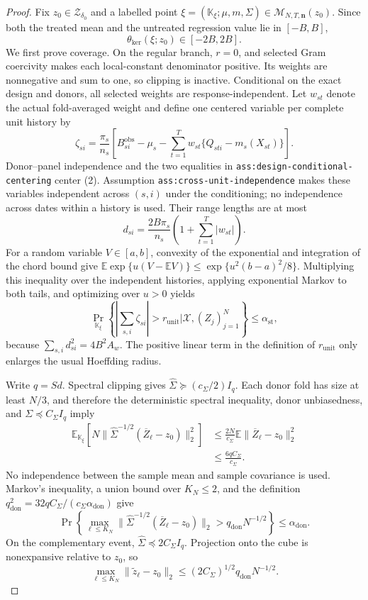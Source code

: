 \documentclass{article}
\begin{document}
\begin{proof}
Fix \(z_0\in\mathcal Z_{\delta_0}\) and a labelled point
\(\xi=(\mathbb K_\xi;\mu,m,\Sigma)\in
\mathcal M_{N,T,\mathbf n}(z_0)\).  Since both the treated mean and the untreated regression value lie in \([-B,B]\),
\[
 \theta_{\mathrm{ker}}(\xi;z_0)\in[-2B,2B].                 \tag{1}
\]
We first prove coverage.  On the regular branch, \(r=0\), and selected Gram coercivity makes each local-constant denominator positive.  Its weights are nonnegative and sum to one, so clipping is inactive.  Conditional on the exact design and donors, all selected weights are response-independent.  Let \(w_{st}\) denote the actual fold-averaged weight and define one centered variable per complete unit history by
\[
 \zeta_{si}=\frac{\pi_s}{n_s}\left[
 B_{si}^{\mathrm{obs}}-\mu_s-
 \sum_{t=1}^{T}w_{st}\{Q_{sti}-m_s(X_{st})\}\right].       \tag{2}
\]
Donor--panel independence and the two equalities in \texttt{ass:design-conditional-centering} center (2).  Assumption \texttt{ass:cross-unit-independence} makes these variables independent across \((s,i)\) under the conditioning; no independence across dates within a history is used.  Their range lengths are at most
\[
 d_{si}=\frac{2B\pi_s}{n_s}
 \left(1+\sum_{t=1}^{T}|w_{st}|\right).                    \tag{3}
\]
For a random variable \(V\in[a,b]\), convexity of the exponential and integration of the chord bound give
\(\mathbb E\exp\{u(V-\mathbb EV)\}\le
\exp\{u^2(b-a)^2/8\}\).  Multiplying this inequality over the independent histories, applying exponential Markov to both tails, and optimizing over \(u>0\) yields
\[
 \Pr_{\mathbb K_\xi}\!\left\{
 \left|\sum_{s,i}\zeta_{si}\right|>r_{\mathrm{unit}}
 \mathrel{\Big|}\mathcal X,(Z_j)_{j=1}^{N}\right\}
 \le\alpha_{\mathrm{st}},                                  \tag{4}
\]
because \(\sum_{s,i}d_{si}^2=4B^2A_w\).  The positive linear term in the definition of \(r_{\mathrm{unit}}\) only enlarges the usual Hoeffding radius.

Write \(q=Sd\).  Spectral clipping gives
\(\widehat\Sigma\succeq(c_\Sigma/2)I_q\).  Each donor fold has size at least \(N/3\), and therefore the deterministic spectral inequality, donor unbiasedness, and \(\Sigma\preceq C_\Sigma I_q\) imply
\[
\begin{aligned}
 \mathbb E_{\mathbb K_\xi}\!\left[
 N\|\widehat\Sigma^{-1/2}(\overline Z_\ell-z_0)\|_2^2
 \right]
 &\le \frac{2N}{c_\Sigma}
       \mathbb E\|\overline Z_\ell-z_0\|_2^2\\
 &\le\frac{6qC_\Sigma}{c_\Sigma}.
\end{aligned}                                               \tag{5}
\]
No independence between the sample mean and sample covariance is used.  Markov's inequality, a union bound over \(K_N\le2\), and the definition
\(q_{\mathrm{don}}^2=32qC_\Sigma/(c_\Sigma\alpha_{\mathrm{don}})\) give
\[
 \Pr\left\{
 \max_{\ell\le K_N}\|\widehat\Sigma^{-1/2}
 (\overline Z_\ell-z_0)\|_2>
 q_{\mathrm{don}}N^{-1/2}\right\}
 \le\alpha_{\mathrm{don}}.                                 \tag{6}
\]
On the complementary event, \(\widehat\Sigma\preceq2C_\Sigma I_q\).  Projection onto the cube is nonexpansive relative to \(z_0\), so
\[
 \max_{\ell\le K_N}\|\widetilde z_\ell-z_0\|_2
 \le(2C_\Sigma)^{1/2}q_{\mathrm{don}}N^{-1/2}.             \tag{7}
\]


\end{proof}
\end{document}
